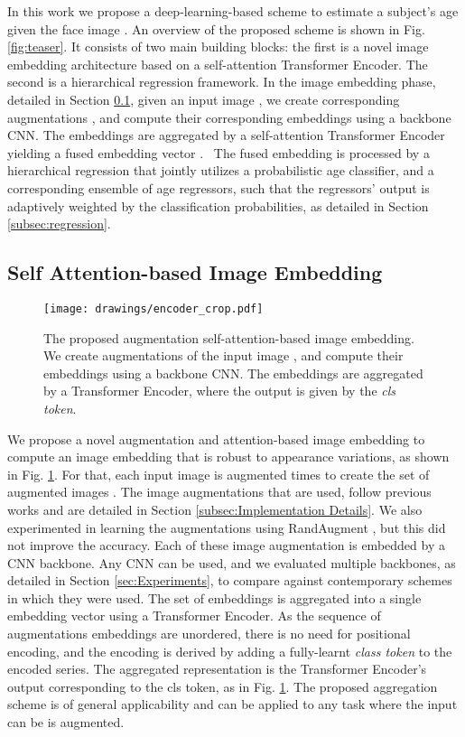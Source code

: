\documentclass[10pt,twocolumn,letterpaper]{article}
\begin{document}
\label{sec:Proposed Method}

In this work we propose a deep-learning-based scheme to estimate a subject's
age  given the face image . An overview of the
proposed scheme is shown in Fig. \ref{fig:teaser}. It consists of two main
building blocks: the first is a novel image embedding architecture based on
a self-attention Transformer Encoder. The second is a hierarchical
regression framework. In the image embedding phase, detailed in Section \ref {subsec:self-atten}, given an input image , we create 
corresponding augmentations , and
compute their corresponding embeddings  using a backbone CNN. The embeddings  are aggregated by a self-attention Transformer
Encoder yielding a fused embedding vector . \
The fused embedding is processed by a hierarchical regression that jointly
utilizes a probabilistic age classifier, and a corresponding ensemble of age
regressors, such that the regressors' output is adaptively weighted by the
classification probabilities, as detailed in Section \ref{subsec:regression}.

\subsection{Self Attention-based Image Embedding}

\label{subsec:self-atten}
\begin{figure}[tbp]
\begin{center}
\centering\texttt{[image: drawings/encoder\_crop.pdf]}
\end{center}
\caption{The proposed augmentation self-attention-based image embedding. We
create  augmentations  of the
input image , and compute their embeddings  using a backbone CNN. The embeddings are
aggregated by a Transformer Encoder, where the output is given by the
\textit{cls token}.}
\label{fig:encoder}
\end{figure}

We propose a novel augmentation and attention-based image embedding to
compute an image embedding that is robust to appearance variations, as shown
in Fig. \ref{fig:encoder}. For that, each input image  is
augmented  times to create the set of augmented images . The image augmentations that are used, follow previous
works and are detailed in Section \ref{subsec:Implementation Details}. We
also experimented in learning the augmentations using RandAugment \cite {Randaugment}, but this did not improve the accuracy. Each of these image
augmentation  is embedded by a CNN backbone. Any CNN can be used, and we
evaluated multiple backbones, as detailed in Section \ref{sec:Experiments},
to compare against contemporary schemes in which they were used. The set of
embeddings  is aggregated into a single embedding vector  using a Transformer Encoder. As the sequence of augmentations
embeddings are unordered, there is no need for positional encoding, and the
encoding is derived by adding a fully-learnt \textit{class token}  to the encoded series. The aggregated representation  is the Transformer Encoder's output corresponding to the
cls token, as in Fig. \ref{fig:encoder}. The proposed aggregation scheme is
of general applicability and can be applied to any task where the input can
be is augmented.
\end{document}
